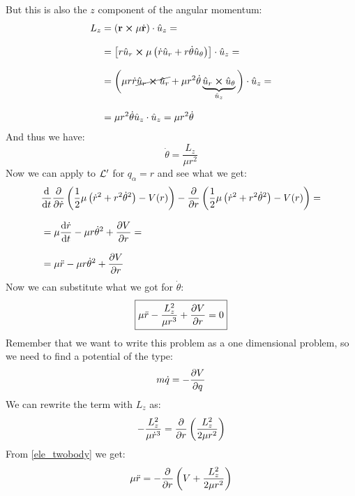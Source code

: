 But this is also the $z$ component of the angular momentum:
\begin{equation}
  \begin{split}
    L_z &= \left(\vb{r}\cross \mu\dot{\vb{r}}\right) \cdot \hat{u}_z = \\[8pt]
    &= \left[r\hat{u}_r \cross \mu\left(\dot{r}\hat{u}_r + r\dot{\theta}\hat{u}_{\theta}\right)\right] \cdot \hat{u}_z = \\[8pt]
    &= \bigg(\mu r\dot{r} \cancel{\hat{u}_r \cross \hat{u}_r} + \mu r^2\dot{\theta}\underbrace{\hat{u}_r \cross \hat{u}_{\theta}}_{\hat{u}_z}\bigg) \cdot \hat{u}_z = \\[8pt]
    &= \mu r^2\dot{\theta} \hat{u}_z \cdot \hat{u}_z = \mu r^2\dot{\theta}
  \end{split}
\end{equation}
And thus we have:
\begin{equation}
  \dot{\theta} = \dfrac{L_z}{\mu r^2}
\end{equation}
Now we can apply \eleref\;to $\mathcal{L}'$ for $q_{\alpha} = r$ and see what we get:
\begin{equation}
  \begin{split}
    &\dv{}{t}\pdv{}{\dot{r}}\brackets{\dfrac{1}{2}\mu\brackets{\dot{r}^2 + r^2\dot{\theta}^2} - V(r)} - \pdv{}{r}\brackets{\dfrac{1}{2}\mu\brackets{\dot{r}^2 + r^2\dot{\theta}^2} - V(r)} = \\[8pt]
    &= \mu\dv{\dot{r}}{t} - \mu r\dot{\theta}^2 + \pdv{V}{r}  = \\[8pt]
    &= \mu \ddot{r} - \mu r\dot{\theta}^2 + \pdv{V}{r}
  \end{split}
\end{equation}
Now we can substitute what we got for $\dot{\theta}$:
\begin{equation} \label{ele_twobody}
  \boxed{\mu \ddot{r} - \dfrac{L_z^2}{\mu r^3} + \pdv{V}{r} = 0}
\end{equation}
Remember that we want to write this problem as a one dimensional problem, so we need to find a potential of the type:
\begin{equation}
  m\dot{q} = -\pdv{V}{q}
\end{equation}
We can rewrite the term with $L_z$ as:
\begin{equation}
  - \dfrac{L_z^2}{\mu \dot{r}^3} = \pdv{}{r}\brackets{\dfrac{L_z^2}{2\mu r^2}}
\end{equation}
From \eqref{ele_twobody} we get:
\begin{equation}
  \mu \ddot{r} = -\pdv{}{r}\brackets{V + \dfrac{L_z^2}{2\mu r^2}}
\end{equation}
